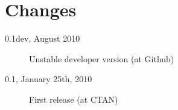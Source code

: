 \documentclass[a4paper,10pt]{article}
\def\ormVersion{0.1dev}
\def\ormDate{August 2010}
\newif\ifappendix
\begin{document}


\section*{Changes}

\begin{description}
  \item[\ormVersion, \ormDate]
    Unstable developer version (at Github)
  \item[0.1, January 25th, 2010]
    First release (at CTAN)
\end{description}

\ifappendix
  
  \addcontentsline{toc}{section}{References}
  
  \addcontentsline{toc}{section}{Index}
  \printindex
\fi
\end{document}
